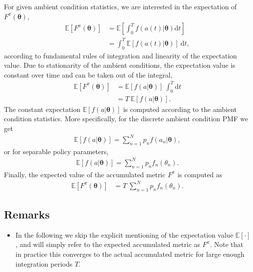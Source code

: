 \documentclass{article}
\begin{document}
For given ambient condition statistics, we are interested in the expectation of $F^\pi(\boldsymbol{\theta})$,
\begin{align}
    \mathbb{E}\left[F^\pi(\boldsymbol{\theta})\right]&= \mathbb{E}\left[\int_0^T f(a(t) | \boldsymbol{\theta}) \text{d}t\right]\\
    &= \int_0^T \mathbb{E}\left[f(a(t) | \boldsymbol{\theta})\right]\ \text{d}t,
\end{align}
according to fundamental rules of integration and linearity of the expectation value. Due to stationarity of the ambient conditions, the expectation value is constant over time and can be taken out of the integral,
\begin{align}
    \mathbb{E}\left[F^\pi(\boldsymbol{\theta})\right]&= \mathbb{E}\left[f(a| \boldsymbol{\theta})\right]\ \int_0^T \text{d}t\nonumber\\
    &= T\ \mathbb{E}\left[f(a| \boldsymbol{\theta})\right].
\end{align}
The constant expectation $\mathbb{E}\left[f(a| \boldsymbol{\theta})\right]$ is computed according to the ambient condition statistics. More specifically, for the discrete ambient condition PMF we get 
\begin{align}
    \mathbb{E}\left[f(a | \boldsymbol{\theta})\right] = \sum_{n = 1}^N p_n f(a_n | \boldsymbol{\theta}),
\end{align}
or for separable policy parameters,
\begin{align}
    \mathbb{E}\left[f(a | \boldsymbol{\theta})\right] = \sum_{n = 1}^N p_n f_n(\theta_n).
\end{align}
Finally, the expected value of the accumulated metric $F^\pi$ is computed as 
\begin{align}
    \mathbb{E}\left[F^\pi(\boldsymbol{\theta})\right]&= T\ \sum_{n = 1}^N p_n f_n(\theta_n).
\end{align}
\subsection*{Remarks}
\begin{itemize}
    \item In the following we skip the explicit mentioning of the expectation value $\mathbb{E}\left[\cdot\right]$, and will simply refer to the expected accumulated metric as $F^\pi$. Note that in practice this converges to the actual accumulated metric for large enough integration periods $T$.
\end{itemize}
\end{document}

